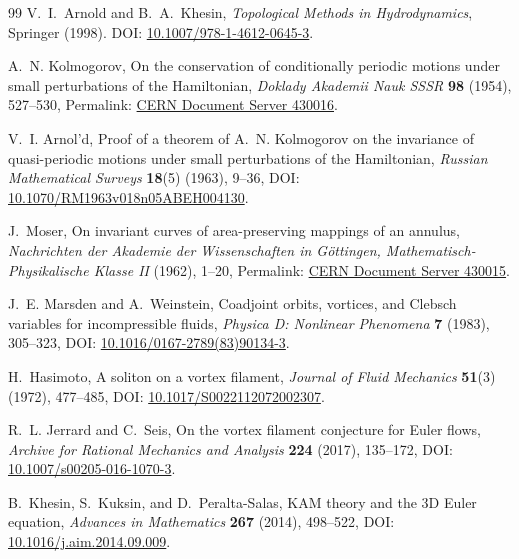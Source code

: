 \begin{thebibliography}{99}
V.~I.~Arnold and B.~A.~Khesin,
\emph{Topological Methods in Hydrodynamics},
Springer (1998).
DOI: \href{https://doi.org/10.1007/978-1-4612-0645-3}{10.1007/978-1-4612-0645-3}.


A.~N. Kolmogorov,
\newblock On the conservation of conditionally periodic motions under small perturbations of the Hamiltonian,
\newblock \emph{Doklady Akademii Nauk SSSR} \textbf{98} (1954), 527--530,
\newblock Permalink: \href{https://cds.cern.ch/record/430016}{CERN Document Server 430016}.

V.~I. Arnol'd,
\newblock Proof of a theorem of A.~N. Kolmogorov on the invariance of quasi-periodic motions under small perturbations of the Hamiltonian,
\newblock \emph{Russian Mathematical Surveys} \textbf{18}(5) (1963), 9--36,
\newblock DOI: \href{https://doi.org/10.1070/RM1963v018n05ABEH004130}{10.1070/RM1963v018n05ABEH004130}.

J.~Moser,
\newblock On invariant curves of area-preserving mappings of an annulus,
\newblock \emph{Nachrichten der Akademie der Wissenschaften in G\"ottingen, Mathematisch-Physikalische Klasse II} (1962), 1--20,
\newblock Permalink: \href{https://cds.cern.ch/record/430015}{CERN Document Server 430015}.

J.~E. Marsden and A.~Weinstein,
\newblock Coadjoint orbits, vortices, and Clebsch variables for incompressible fluids,
\newblock \emph{Physica D: Nonlinear Phenomena} \textbf{7} (1983), 305--323,
\newblock DOI: \href{https://doi.org/10.1016/0167-2789(83)90134-3}{10.1016/0167-2789(83)90134-3}.

H.~Hasimoto,
\newblock A soliton on a vortex filament,
\newblock \emph{Journal of Fluid Mechanics} \textbf{51}(3) (1972), 477--485,
\newblock DOI: \href{https://doi.org/10.1017/S0022112072002307}{10.1017/S0022112072002307}.

R.~L. Jerrard and C.~Seis,
\newblock On the vortex filament conjecture for Euler flows,
\newblock \emph{Archive for Rational Mechanics and Analysis} \textbf{224} (2017), 135--172,
\newblock DOI: \href{https://doi.org/10.1007/s00205-016-1070-3}{10.1007/s00205-016-1070-3}.

B.~Khesin, S.~Kuksin, and D.~Peralta-Salas,
\newblock KAM theory and the 3D Euler equation,
\newblock \emph{Advances in Mathematics} \textbf{267} (2014), 498--522,
\newblock DOI: \href{https://doi.org/10.1016/j.aim.2014.09.009}{10.1016/j.aim.2014.09.009}.


\end{thebibliography}
